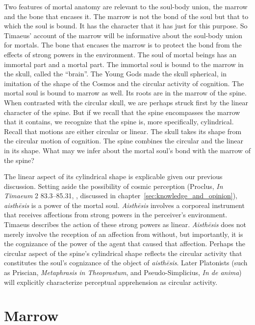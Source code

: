 Two features of mortal anatomy are relevant to the soul-body union, the marrow and the bone that encases it. The marrow is not the bond of the soul but that to which the soul is bound. It has the character that it has just for this purpose. So Timaeus' account of the marrow will be informative about the soul-body union for mortals. The bone that encases the marrow is to protect the bond from the effects of strong powers in the environment. The soul of mortal beings has an immortal part and a mortal part. The immortal soul is bound to the marrow in the skull, called the ``brain''. The Young Gods made the skull spherical, in imitation of the shape of the Cosmos and the circular activity of cognition. The mortal soul is bound to marrow as well. Its roots are in the marrow of the spine. When contrasted with the circular skull, we are perhaps struck first by the linear character of the spine. But if we recall that the spine encompasses the marrow that it contains, we recognize that the spine is, more specifically, cylindrical. Recall that motions are either circular or linear. The skull takes its shape from the circular motion of cognition. The spine combines the circular and the linear in its shape. What may we infer about the mortal soul's bond with the marrow of the spine?

The linear aspect of its cylindrical shape is explicable given our previous discussion. Setting aside the possibility of cosmic perception (Proclus, \emph{In Timaeum} 2 83.3–85.31, \citealt{Diehl:1903re}, discussed in chapter~\ref{sec:knowledge_and_opinion}), \emph{aisthēsis} is a power of the mortal soul. \emph{Aisthēsis} involves a corporeal instrument that receives affections from strong powers in the perceiver's environment. Timaeus describes the action of these strong powers as linear. \emph{Aisthēsis} does not merely involve the reception of an affection from without, but importantly, it is the cognizance of the power of the agent that caused that affection. Perhaps the circular aspect of the spine's cylindrical shape reflects the circular activity that constitutes the soul's cognizance of the object of \emph{aisthēsis}. Later Platonists (such as Priscian, \emph{Metaphrasis in Theoprastum}, and Pseudo-Simplicius, \emph{In de anima}) will explicitly characterize perceptual apprehension as circular activity.


\section{Marrow} %
\label{sec:marrow}

